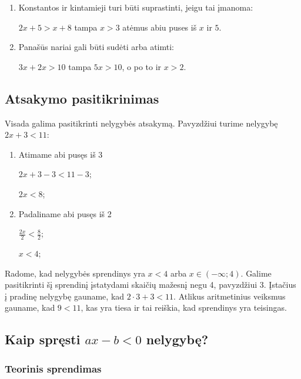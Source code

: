 \documentclass[a4paper]{article}
\begin{document}
\begin{enumerate}
\begin{enumerate}[label*=\arabic*.]
                  \item Konstantos ir kintamieji turi būti suprastinti, jeigu
                        tai įmanoma:

                        $2x+5>x+8$ tampa $x>3$ atėmus abiu puses iš $x$ ir $5$.

                  \item Panašūs nariai gali būti sudėti arba atimti:

                        $3x+2x>10$ tampa $5x>10$, o po to ir $x>2$.

            \end{enumerate}

\end{enumerate}

\subsection{Atsakymo pasitikrinimas}

Visada galima pasitikrinti nelygybės atsakymą. Pavyzdžiui turime nelygybę
$2x+3<11$:

\begin{enumerate}
      \item Atimame abi pusęs iš 3

            $2x+3-3<11-3$;

            $2x<8$;

      \item Padaliname abi pusęs iš 2

            $\frac{2x}{2}<\frac{8}{2}$;

            $x<4$;
\end{enumerate}

Radome, kad nelygybės sprendinys yra $x<4$ arba $x\in (-\infty;4)$. Galime
pasitikrinti šį sprendinį įstatydami skaičių mažesnį negu 4, pavyzdžiui 3.
Įstačius į pradinę nelygybę gauname, kad $2\cdot3+3<11$. Atlikus aritmetinius
veiksmus gauname, kad $9<11$, kas yra tiesa ir tai reiškia, kad sprendinys yra
teisingas.

\subsection{Kaip spręsti $ax-b<0$ nelygybę?}

\subsubsection{Teorinis sprendimas}
\end{document}
